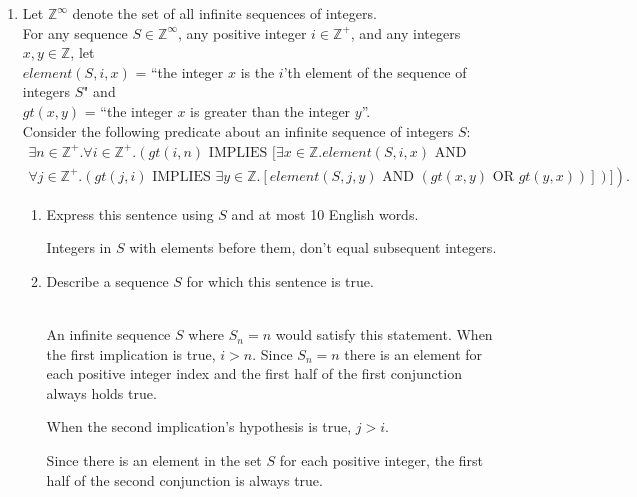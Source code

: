 \documentclass[11pt]{article}
\def\ints {{\mathbb Z}}
\newcommand{\Implies}{\mbox{ IMPLIES }}
\newcommand{\Or}{\mbox{ OR }}
\renewcommand{\And}{\mbox{ AND }}
\begin{document}
\begin{enumerate}
\item
\begin{question}
Let $\ints^\infty$ denote the set of all infinite sequences of integers.\\
For any
sequence $S \in \ints^{\infty}$, any positive integer $i \in \ints^+$, and any
integers $x,y  \in \ints$,
let\\
$element(S,i,x)$ = ``the integer $x$
is the $i$'th element of the sequence of integers $S$"  and\\
$gt(x,y)$ =  ``the integer $x$ is greater than the integer $y$''.\\
Consider the following predicate about an infinite sequence of integers $S$:
$$\begin{array}{l}
\exists n \in \ints^+. \forall i \in \ints^+.  \left( gt(i,n) \Implies [ \exists x\in \ints. element(S,i,x) \And \right.\\
\left. \forall j \in \ints^+. (gt(j,i) \Implies \exists y\in \ints. [element(S,j,y)
\And (gt(x,y) \Or gt(y,x))])]\right).
\end{array}$$
\end{question}
\begin{enumerate}
\item
\begin{question}
Express this sentence using $S$ and at most 10 English words. \\
\end{question}
\begin{solution}
Integers in $S$ with elements before them, don't equal subsequent integers.
\end{solution}
\item
\begin{question}
Describe a sequence $S$ for which this sentence is true.\\
\end{question}
\begin{solution}
\\
An infinite sequence $S$ where $S_n=n$ would satisfy this statement.
When the first implication is true,  $i>n$.
Since $S_n = n$ there is an element for each positive integer index and the first half of the first conjunction always holds true.

When the second implication's hypothesis is true, $j>i$.

Since there is an element in the set $S$ for each positive integer, the first half of the second conjunction is always true.


\end{solution}
\end{enumerate}
\end{enumerate}
\end{document}
